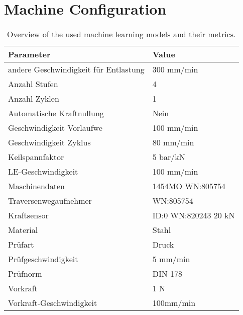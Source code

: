 \section*{Machine Configuration}\label{sec:machine-configuration}

\begin{table}[H]
    \begin{tcolorbox}[arc=0pt,boxrule=0.5pt]
        \centering
        \begin{tabular}{ll}
            \toprule
            \textbf{Parameter} & \textbf{Value}
            \\
            \toprule
            andere Geschwindigkeit für Entlastung & 300 mm/min           \\
            Anzahl Stufen                         & 4                    \\
            Anzahl Zyklen                         & 1                    \\
            Automatische Kraftnullung             & Nein                 \\
            Geschwindigkeit Vorlaufwe             & 100 mm/min           \\
            Geschwindigkeit Zyklus                & 80 mm/min            \\
            Keilspannfaktor                       & 5 bar/kN             \\
            LE-Geschwindigkeit                    & 100 mm/min           \\
            \hdashline
            Maschinendaten                        & 1454MO WN:805754     \\
            Traversenwegaufnehmer                 & WN:805754            \\
            Kraftsensor                           & ID:0 WN:820243 20 kN \\
            \hdashline
            Material                              & Stahl                \\
            Prüfart                               & Druck                \\
            Prüfgeschwindigkeit                   & 5 mm/min             \\
            Prüfnorm                              & DIN 178              \\
            Vorkraft                              & 1 N                  \\
            Vorkraft-Geschwindigkeit              & 100mm/min            \\
            \bottomrule
        \end{tabular}
    \end{tcolorbox}
    \caption{Overview of the used machine learning models and their metrics.}
    \label{tab:machine-config}
\end{table}


